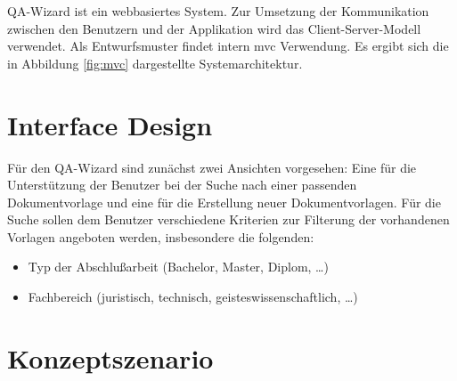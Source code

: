 \documentclass[11pt,        %
  english,ngerman,          %
  paper=a4,                 %
  captions=tablesignature,  %
  listof=numbered,          %
  bibliography=totoc,       %
  headings=small,           %
  headinclude=false,        %
  footinclude=false,        %
  parskip=half-,            %
  oneside,                  %
  BCOR=15mm,                 %
  DIV=12                    %
  ]{scrbook}                %
\begin{document}
QA-Wizard ist ein webbasiertes System. Zur Umsetzung der Kommunikation zwischen den Benutzern und der Applikation wird das Client-Server-Modell verwendet. Als Entwurfsmuster findet intern \gls{mvc} Verwendung. Es ergibt sich die in Abbildung \ref{fig:mvc} dargestellte Systemarchitektur.


\section{Interface Design}\label{sec:concept_interface}


Für den QA-Wizard sind zunächst zwei Ansichten vorgesehen: Eine für die Unterstützung der Benutzer bei der Suche nach einer passenden Dokumentvorlage und eine für die Erstellung neuer Dokumentvorlagen. Für die Suche sollen dem Benutzer verschiedene Kriterien zur Filterung der vorhandenen Vorlagen angeboten werden, insbesondere die folgenden:

\begin{itemize}
  \item Typ der Abschlußarbeit (Bachelor, Master, Diplom, \ldots)
  \item Fachbereich (juristisch, technisch, geisteswissenschaftlich, \ldots)
\end{itemize}

\section{Konzeptszenario}\label{sec:design_sce}



\end{document}
